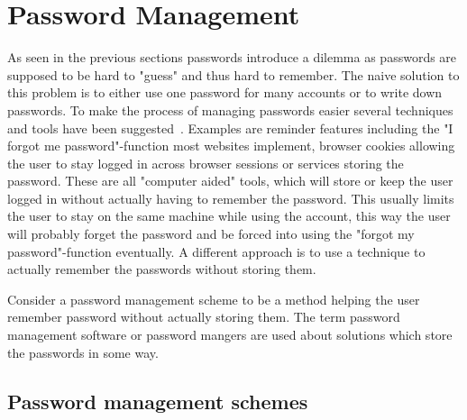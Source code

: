 \section{Password Management}
As seen in the previous sections passwords introduce a dilemma as passwords are supposed to be hard to "guess" and thus hard to remember. The naive solution to this problem is to either use one password for many accounts or to write down passwords. To make the process of managing passwords easier several techniques and tools have been suggested~\cite{management-strategies}. Examples are reminder features including the "I forgot me password"-function most websites implement, browser cookies allowing the user to stay logged in across browser sessions or services storing the password. These are all "computer aided" tools, which will store or keep the user logged in without actually having to remember the password. This usually limits the user to stay on the same machine while using the account, this way the user will probably forget the password and be forced into using the "forgot my password"-function eventually. A different approach is to use a technique to actually remember the passwords without storing them.
\par Consider a password management scheme to be a method helping the user remember password without actually storing them. The term password management software or password mangers are used about solutions which store the passwords in some way.

\subsection{Password management schemes}
 
